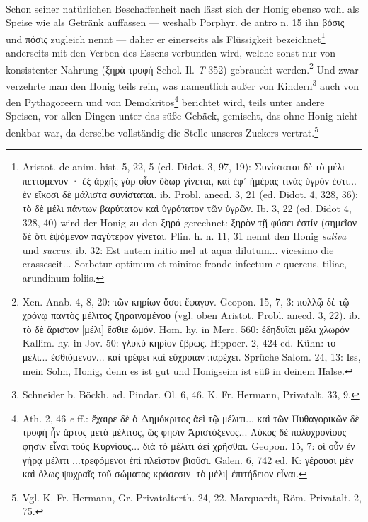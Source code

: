 \documentclass[a4paper, 11pt, oneside]{article}
\begin{document}
\paragraph{}
Schon seiner natürlichen Beschaffenheit nach lässt sich der Honig ebenso wohl als Speise wie als Getränk auffassen --- weshalb Porphyr. de antro n. 15 ihn βόσις und πόσις zugleich nennt --- daher er einerseits als Flüssigkeit bezeichnet\footnote{Aristot. de anim. hist. 5, 22, 5 (ed. Didot. 3, 97, 19): Συνίσταται δὲ τὸ μέλι πεττόμενον · ἐξ ἀρχῆς γὰρ οἷον ὕδωρ γίνεται, καὶ
ἐφ᾽ ἡμέρας τινὰς ὑγρόν ἐστι... ἐν εἴκοσι δὲ μάλιστα συνίσταται. ib. Probl. anecd. 3, 21 (ed. Didot. 4, 328, 36): τὸ δὲ μέλι πάντων βαρύτατον καὶ ὑγρότατον τῶν ὑγρῶν. Ib. 3, 22 (ed. Didot 4, 328, 40) wird der Honig zu den ξηρά gerechnet: ξηρὸν τῇ φύσει ἐστίν (σημεῖον δὲ ὅτι ἑψόμενον παγύτερον γίνεται. Plin. h. n. 11, 31 nennt den Honig \emph{saliva} und \emph{succus}. ib. 32: Est autem initio mel ut aqua dilutum... vicesimo die crassescit... Sorbetur optimum et minime fronde infectum e quercus, tiliae, arundinum foliis.} anderseits mit den Verben des Essens verbunden wird, welche sonst nur von konsistenter Nahrung (ξηρὰ τροφή Schol. Il. \emph{T} 352) gebraucht werden.\footnote{Xen. Anab. 4, 8, 20: τῶν κηρίων ὅσοι ἔφαγον. Geopon. 15, 7, 3: πολλῷ δὲ τῷ χρόνῳ παντὸς μέλιτος ξηραινομένου (vgl. oben Aristot. Probl. anecd. 3, 22). ib. τὸ δὲ ἄριστον [μέλι] ἔσθιε ὠμόν. Hom. hy. in Merc. 560: ἐδηδυῖαι μέλι χλωρόν Kallim. hy. in Jov. 50: γλυκὺ κηρίον ἔβρως. Hippocr. 2, 424 ed. Kühn: τὸ μέλι... ἐσθιόμενον... καὶ τρέφει καὶ εὔχροιαν παρέχει. Sprüche Salom. 24, 13: Iss, mein Sohn, Honig, denn es ist gut und Honigseim ist süß in deinem Halse.} Und zwar verzehrte man den Honig teils rein, was namentlich außer von Kindern\footnote{Schneider b. Böckh. ad. Pindar. Ol. 6, 46. K. Fr. Hermann, Privatalt. 33, 9.} auch von den Pythagoreern und von Demokritos\footnote{Ath. 2, 46 \emph{e} ff.: ἔχαιρε δὲ ὁ Δημόκριτος ἀεὶ τῷ μέλιτι... καὶ τῶν Πυθαγορικῶν δὲ τροφὴ ἦν ἄρτος μετὰ μέλιτος, ὥς φησιν Ἀριστόξενος... Λύκος δὲ πολυχρονίους φησὶν εἶναι τοὺς Κυρνίους... διὰ τὸ μέλιτι ἀεὶ χρῆσθαι. Geopon. 15, 7: οἱ οὖν ἐν γήρᾳ μέλιτι ...τρεφόμενοι ἐπὶ πλεῖστον βιοῦσι. Galen. 6, 742 ed. K: γέρουσι μὲν καὶ ὅλως ψυχραῖς τοῦ σώματος κράσεσιν [τὸ μέλι] ἐπιτήδειον εἶναι.} berichtet wird, teils unter andere Speisen, vor allen Dingen unter das süße Gebäck, gemischt, das ohne Honig nicht denkbar war, da derselbe vollständig die Stelle unseres Zuckers vertrat.\footnote{Vgl. K. Fr. Hermann, Gr. Privatalterth. 24, 22. Marquardt, Röm. Privatalt. 2, 75.}
\end{document}
